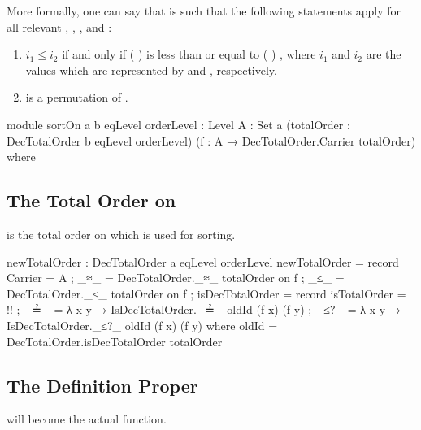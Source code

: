 \documentclass{report}
\begin{document}
More formally, one can say that  is such that the following statements apply for all relevant , , , and :

\begin{enumerate}
  \item \(i_1 \leq i_2\) if and only if  \AgdaSymbol(  \AgdaSymbol)  is less than or equal to  \AgdaSymbol(  \AgdaSymbol) , where \(i_1\) and \(i_2\) are the values which are represented by  and , respectively.\label{enum:sortOn-ordering}
  \item {}   is a permutation of .\label{enum:sortOn-permutation}
\end{enumerate}

\begin{code}
module sortOn {a b eqLevel orderLevel : Level}
              {A : Set a}
              (totalOrder : DecTotalOrder b eqLevel orderLevel)
              (f : A → DecTotalOrder.Carrier totalOrder) where
\end{code}

\subsection{The Total Order on }
 is the total order on  which is used for sorting.

\begin{code}
  newTotalOrder : DecTotalOrder a eqLevel orderLevel
  newTotalOrder = record
    { Carrier = A
    ; _≈_ = DecTotalOrder._≈_ totalOrder on f
    ; _≤_ = DecTotalOrder._≤_ totalOrder on f
    ; isDecTotalOrder = record
      { isTotalOrder = {!!}
      ; _≟_ = λ x y → IsDecTotalOrder._≟_ oldId (f x) (f y)
      ; _≤?_ = λ x y → IsDecTotalOrder._≤?_ oldId (f x) (f y)
      }
    }
    where oldId = DecTotalOrder.isDecTotalOrder totalOrder
\end{code}

\subsection{The Definition Proper}
 will become the actual  function.
\end{document}
